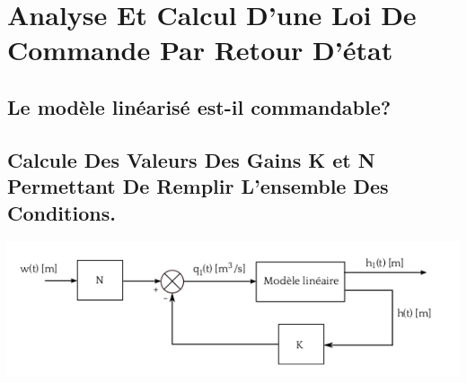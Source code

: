 \chapter{Analyse  Et Calcul  D’une Loi De Commande  Par Retour  D’état }
 \section{Le modèle linéarisé est-il commandable?}
 
 
 
 
 
 
 \section{Calcule Des Valeurs Des Gains K et N Permettant De Remplir L’ensemble Des Conditions.}
 
\begin{center}
\includegraphics[scale=0.5]{fig2.png}
\label{fig2} 
\end{center}


